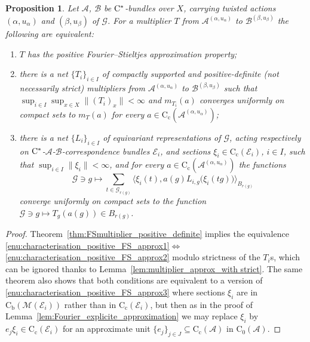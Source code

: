 \documentclass[11 pt, leqno]{amsart}
\numberwithin{equation}{section}
\theoremstyle{plain}
\newtheorem {prop}[thm] {Proposition}
\theoremstyle{definition}
\newcommand*{\contc}{\mathrm{C_c}}%
\newcommand*{\contz}{\mathrm{C_0}}%
\newcommand*{\contb}{\mathrm{C_b}}%
\newcommand{\B}{\mathcal B}
\newcommand{\M}{\mathcal M}
\newcommand{\m}{m}
\newcommand{\G}{\mathcal G} %
\newcommand{\EE}{\mathcal E}
\newcommand{\A}{\mathcal A}
\newcommand{\cst}{\ifmmode\mathrm{C}^*\else{$\mathrm{C}^*$}\fi}
\begin{document}
\begin{prop}\label{prop:characterisation_positive_FS_approx}
Let $\A$, $\B$  be $\cst$-bundles over $X$, carrying twisted actions $(\alpha,u_\alpha)$ and $(\beta,u_\beta)$ of $\G$. 
For a multiplier $T$ from $\A^{(\alpha,u_{\alpha})}$ to $\B^{(\beta,u_{\beta})}$ the following are equivalent:
\begin{enumerate}
    \item\label{enu:characterisation_positive_FS_approx1} $T$ has the positive Fourier--Stieltjes approximation property;  
    \item\label{enu:characterisation_positive_FS_approx2} there is a net $\{T_{i}\}_{i\in I}$  of compactly supported  and positive-definite (not necessarily strict) multipliers from $\A^{(\alpha,u_{\alpha})}$ to $\B^{(\beta,u_{\beta})}$ such that $\sup_{i\in I}\sup_{x\in X}\|(T_i)_{x}\|<\infty$ and $\m_{T_i}(a)$ converges uniformly on compact sets to $\m_{T}(a)$ for every $a\in\contc(\A^{(\alpha,u_{\alpha})})$;
    \item\label{enu:characterisation_positive_FS_approx3} there is a net $\{L_i\}_{i \in I}$ of equivariant representations of $\G$, acting respectively on $\cst$-$\A$-$\B$-correspondence bundles $\EE_i$, and sections $\xi_i\in \contc(\EE_i)$, $i\in I$, such that $\sup_{i\in I}\|\xi_i\| <\infty$, and for every $a\in\contc(\A^{(\alpha,u_{\alpha})})$ the functions 
    \[
        \G\ni g\longmapsto \sum_{t\in \G_{r(g)}}\langle \xi_i(t), a(g)L_{i,g}\big(\xi_i(tg)\big)\rangle_{B_{r(g)}}
    \]
    converge uniformly on compact sets to the function $\G\ni g\longmapsto T_{g}(a(g))\in B_{r(g)}$. 
\end{enumerate}
\end{prop}
\begin{proof}  
Theorem~\ref{thm:FSmultiplier_positive_definite} implies the equivalence \ref{enu:characterisation_positive_FS_approx1}$\iff$
\ref{enu:characterisation_positive_FS_approx2} modulo strictness of the $T_i$s, which can be ignored thanks to Lemma~\ref{lem:multiplier_approx_with strict}. 
The same theorem also shows that both conditions are equivalent to a version of \ref{enu:characterisation_positive_FS_approx3} where sections $\xi_i$ are in $\contb(\M(\EE_i))$ rather than in $\contc(\EE_i)$, but then as in the proof of Lemma~\ref{lem:Fourier_explicite_approximation} we may replace $\xi_i$ by $e_j\xi_i\in \contc(\EE_i)$ for an approximate unit $\{e_j\}_{j \in J}\subseteq \contc(\A)$ in $\contz(\A)$. 
\end{proof}
\end{document}

